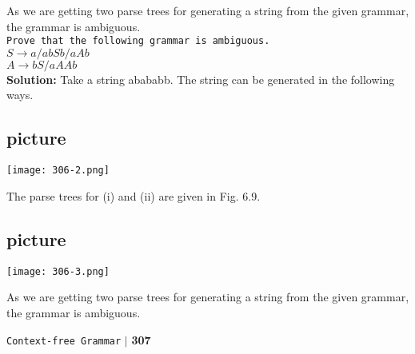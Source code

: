 \documentclass{article}
\begin{document}
\hspace*{0.5cm} As we are getting two parse trees for generating a string from the given grammar, the grammar is
ambiguous.\\

\hspace*{0.1cm} \texttt{Prove that the following grammar is ambiguous.}\\

\vspace*{0.1cm}
\hspace*{4cm} $S \rightarrow a/abSb/aAb$ \\
\hspace*{4cm} $A \rightarrow bS/aAAb$ \\

\vspace*{0.2cm}
\textbf{Solution:} Take a string abababb. The string can be generated in the following ways.\\

\begin{flushleft}
  \section{picture}
\texttt{[image: 306-2.png]}
\end{flushleft}


\hspace*{0.5cm} The parse trees for (i) and (ii) are given in Fig. 6.9.\\

\begin{center}
\section{picture}
\texttt{[image: 306-3.png]}
\end{center}

\hspace*{0.5cm} As we are getting two parse trees for generating a string from the given grammar, the grammar is
ambiguous.\\

\newpage
\begin{flushright}
 \texttt{Context-free Grammar} \hspace*{0.10cm}\textbf{$|$} \textbf{307}\hspace*{0.5cm}
\end{flushright}
\end{document}
